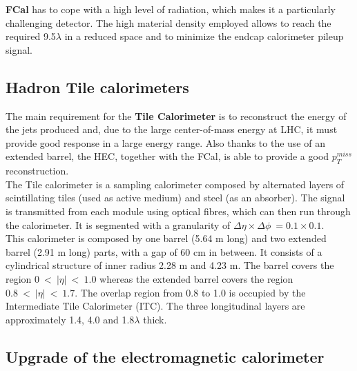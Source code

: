 \documentclass[a4paper,twoside,12pt]{book}
\begin{document}
\textbf{FCal} has to cope with a high level of radiation, which makes it a particularly challenging detector.  The high material density employed allows to reach the required 9.5$\lambda$ in a reduced space and to minimize the endcap calorimeter pileup signal.  \\

\subsection*{Hadron Tile calorimeters}
The main requirement for the \textbf{Tile Calorimeter} is to reconstruct the energy of the jets produced and, due to the large center-of-mass energy at LHC, it must provide
good response in a large energy range. Also thanks to the use of an extended barrel, the HEC, together with the FCal, is able to provide a good $p_T^{miss}$ reconstruction.\\

The Tile calorimeter is a sampling calorimeter composed by alternated layers of scintillating tiles (used as active medium) and steel (as an absorber). The signal is transmitted from each module using optical fibres, which can then run through the calorimeter. It is segmented with a granularity of
$\Delta\eta \times \Delta\phi\ = 0.1 \times 0.1$.\\

This calorimeter is composed by one barrel (5.64 m long) and two extended barrel (2.91 m long) parts, with a gap of 60 cm in between. It consists of a cylindrical structure of inner radius 2.28 m and 4.23 m. The barrel covers the region $0\ <\ |\eta|\ <\ 1.0$ whereas the extended barrel covers the region $0.8\ <\ |\eta|\ <\ 1.7$. The overlap region from 0.8 to 1.0 is
occupied by the Intermediate Tile Calorimeter (ITC). The three longitudinal layers are approximately 1.4, 4.0 and 1.8$\lambda$ thick. \\

\subsection*{Upgrade of the electromagnetic calorimeter}
\end{document}
